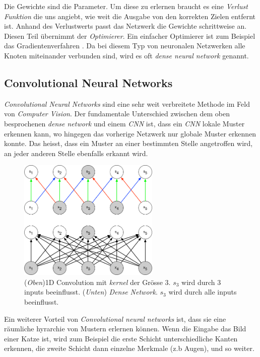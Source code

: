 Die Gewichte sind die Parameter. Um diese zu erlernen braucht es eine \textit{Verlust Funktion} die uns angiebt, wie weit die Ausgabe von den korrekten Zielen entfernt ist. Anhand des Verlustwerts passt das Netzwerk die Gewichte schrittweise an. Diesen Teil übernimmt der  \textit{Optimierer}. Ein einfacher Optimierer ist zum Beispiel das Gradientenverfahren \parencite{gradient}.
Da bei diesem Typ von neuronalen Netzwerken alle Knoten miteinander verbunden sind, wird es oft \textit{dense neural network} genannt.


\subsection{Convolutional Neural Networks}
\textit{Convolutional Neural Networks} sind eine sehr weit verbreitete Methode im Feld von \textit{Computer Vision}. Der fundamentale Unterschied zwischen dem oben besprochenen \textit{dense network} und einem \textit{CNN} ist, dass ein \textit{CNN} lokale Muster erkennen kann, wo hingegen das vorherige Netzwerk nur globale Muster erkennen konnte. Das heisst, dass ein Muster an einer bestimmten Stelle angetroffen wird, an jeder anderen Stelle ebenfalls erkannt wird. \parencite{chollet}
\begin{figure}[hbt]
	\centering
		\includegraphics[width=0.6\textwidth]{assets/conv_1d.png}
	\caption{(\textit{Oben})1D Convolution mit \textit{kernel} der Grösse 3. $s_3$ wird durch 3 inputs beeinflusst.
		     (\textit{Unten}) \textit{Dense Network}. $s_3$ wird durch alle inputs beeinflusst.\parencite{goodfellow}}
	\label{img:conv}
\end{figure}

Ein weiterer Vorteil von \textit{Convolutional neural networks} ist, dass sie eine räumliche hyrarchie von Mustern erlernen können. Wenn die Eingabe das Bild einer Katze ist, wird zum Beispiel die erste Schicht unterschiedliche Kanten erkennen, die zweite Schicht dann einzelne Merkmale (z.b Augen), und so weiter.

